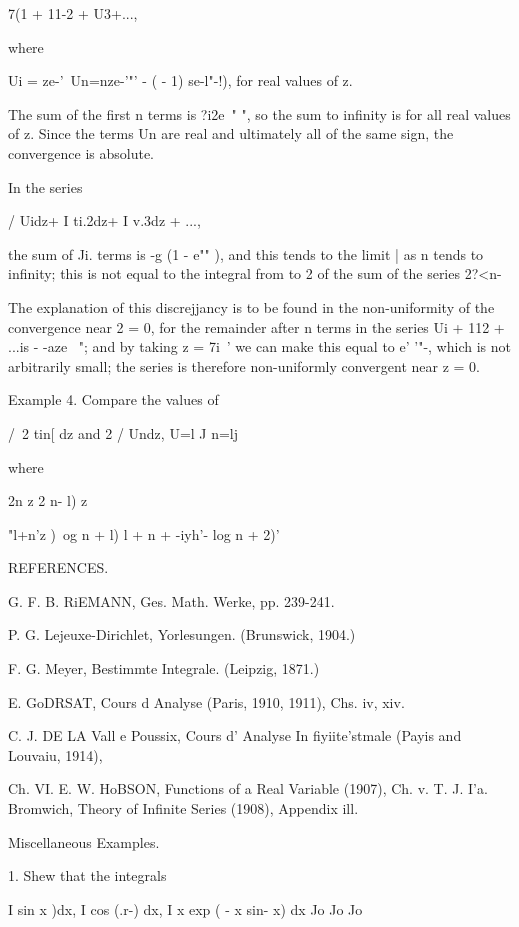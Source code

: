 7(1 + 11-2 + U3+...,

where

Ui = ze-'\ Un=nze-'"' - ( - 1) se-l"-!), for real values of z.

The sum of the first n terms is ?i2e~" ", so the sum to infinity is
for all real values of z. Since the terms Un are real and ultimately
all of the same sign, the convergence is absolute.

In the series

/ Uidz+ I ti.2dz+ I v.3dz + ...,

the sum of Ji. terms is -g (1 - e"" ), and this tends to the limit |
as n tends to infinity; this is not equal to the integral from to 2
of the sum of the series 2?<n-

The explanation of this discrejjancy is to be found in the
non-uniformity of the convergence near 2 = 0, for the remainder after
n terms in the series Ui + 112 + ...is - -aze~ "; and by taking z =
7i~' we can make this equal to e' '"-, which is not arbitrarily small;
the series is therefore non-uniformly convergent near z = 0.

Example 4. Compare the values of

/\ 2 tin[ dz and 2 / Undz, U=l J n=lj

where

2n z 2 n- l) z

"l+n'z )\ og n + l) l + n + -iyh'- log n + 2)'


REFERENCES.

G. F. B. RiEMANN, Ges. Math. Werke, pp. 239-241.

P. G. Lejeuxe-Dirichlet, Yorlesungen. (Brunswick, 1904.)

F. G. Meyer, Bestimmte Integrale. (Leipzig, 1871.)

E. GoDRSAT, Cours d Analyse (Paris, 1910, 1911), Chs. iv, xiv.

C. J. DE LA Vall e Poussix, Cours d' Analyse In fiyiite'stmale (Payis
and Louvaiu, 1914),

Ch. VI. E. W. HoBSON, Functions of a Real Variable (1907), Ch. v. T.
J. I'a. Bromwich, Theory of Infinite Series (1908), Appendix ill.

%
%

Miscellaneous Examples.

1. Shew that the integrals

I sin x )dx, I cos (.r-) dx, I x exp ( - x sin- x) dx Jo Jo Jo

